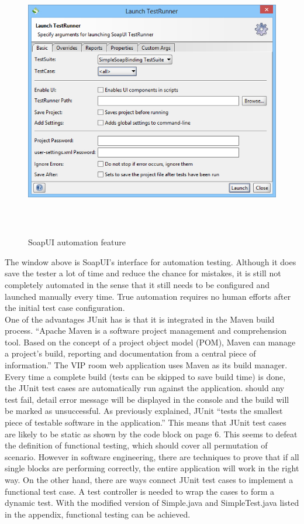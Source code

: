 \documentclass[12pt]{article}
\begin{document}
\begin{figure}[ht!]
\centering
\includegraphics[width=12cm,height=12cm,keepaspectratio]{img/soapAuto.jpg}
\caption{SoapUI automation feature}
\label{overflow}
\end{figure}

The window above is SoapUI's interface for automation testing. Although it does save the tester a lot of time and reduce the chance for mistakes, it is still not completely automated in the sense that it still needs to be configured and launched manually every time. True automation requires no human efforts after the initial test case configuration.\\

One of the advantages JUnit has is that it is integrated in the Maven build process. “Apache Maven is a software project management and comprehension tool. Based on the concept of a project object model (POM), Maven can manage a project's build, reporting and documentation from a central piece of information.”\cite{maven} The VIP room web application uses Maven as its build manager. Every time a complete build (tests can be skipped to save build time) is done, the JUnit test cases are automatically run against the application. should any test fail, detail error message will be displayed in the console and the build will be marked as unsuccessful. As previously explained, JUnit “tests the smallest piece of testable software in the application.”\cite{unit} This means that JUnit test cases are likely to be static as shown by the code block on page 6. This seems to defeat the definition of functional testing, which should cover all permutation of scenario. However in software engineering, there are techniques to prove that if all single blocks are performing correctly, the entire application will work in the right way. On the other hand, there are ways connect JUnit test cases to implement a functional test case. A test controller is needed to wrap the cases to form a dynamic test. With the modified version of Simple.java and SimpleTest.java listed in the appendix, functional testing can be achieved.\\
\end{document}
